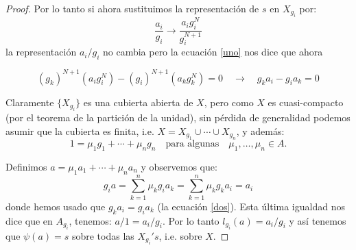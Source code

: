 \documentclass[10pt]{report}
\theoremstyle{plain}\newtheorem{thm}{Teorema}
\theoremstyle{plain}\newtheorem{lem}[thm]{Lema}
\theoremstyle{plain}\newtheorem*{conjecture*}{Conjetura}
\theoremstyle{plain}\newtheorem{cor}[thm]{Corolario}
\theoremstyle{definition}\newtheorem{defin}{Definici\'on}
\theoremstyle{definition}\newtheorem*{defin*}{Definici\'on}
\theoremstyle{remark}\newtheorem{claim}{Proposici\'on}
\theoremstyle{remark}\newtheorem*{claim*}{Proposici\'on}
\theoremstyle{remark}\newtheorem*{eje*}{$\mathbf{Ejercicio}$}
\theoremstyle{remark}\newtheorem{exa}{Ejemplo}
\newcommand{\ra}{\rightarrow}
\begin{document}
\begin{proof}
Por lo tanto si ahora sustituimos la representaci\'on de $s$ en $X_{g_i}$ por:
\[
	\frac{a_i}{g_i} \ra \frac{a_i g_i^{N}}{g_i^{N+1}}
\]
la representaci\'on $a_i/g_i$ no cambia pero la ecuaci\'on \ref{uno} nos dice que ahora 

\begin{equation}\label{dos}
	(g_k)^{N+1} (a_i g_i^N)-(g_i)^{N+1}(a_k g_k^N)=0 \quad\ra\quad g_k a_i - g_i a_k=0
\end{equation}

Claramente $\{X_{g_i}\}$ es una cubierta abierta de $X$, pero como $X$ es cuasi-compacto (por el teorema de la partici\'on
de la unidad), sin p\'erdida de generalidad podemos asumir que la cubierta es finita, i.e. $X=X_{g_1}\cup\cdots\cup X_{g_n}$,
y adem\'as:
\[
	1=\mu_1 g_1+\cdots+\mu_n g_n\quad\text{para algunas}\quad \mu_1,\ldots,\mu_n\in A.
\]

Definimos $a=\mu_1 a_1+\cdots+\mu_n a_n$ y observemos que:
\[
	g_i a= \sum_{k=1}^{n}\mu_k g_i a_k = \sum_{k=1}^{n}\mu_k g_k a_i = a_i
\]
donde hemos usado que $g_k a_i=g_i a_k$ (la ecuaci\'on \ref{dos}). Esta \'ultima igualdad nos dice que en $A_{g_i}$, tenemos:
$a/1=a_i/g_i$. Por lo tanto $l_{g_i}(a)=a_i/g_i$ y as\'i tenemos que $\psi(a)=s$ sobre todas las $X_{g_i}'s$, i.e. sobre $X$.

\end{proof}
\end{document}
